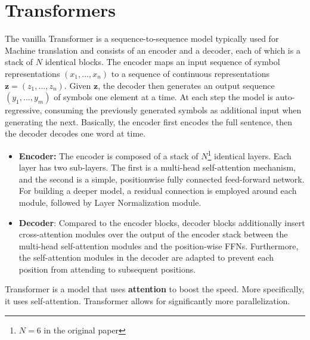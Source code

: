 \section{Transformers}
The vanilla Transformer is a sequence-to-sequence model typically used for Machine translation and consists of an encoder and a decoder, each of which is a stack of $N$ identical blocks. The encoder maps an input sequence of symbol representations $(x_1, ..., x_n)$ to a sequence of continuous representations $\textbf{z} = (z_1, ..., z_n)$. Given $\textbf{z}$, the decoder then generates an output sequence $(y_1, ..., y_m)$ of symbols one element at a time. At each step the model is auto-regressive, consuming the previously generated symbols as additional input when generating the next. Basically, the encoder first encodes the full sentence, then the decoder decodes one word at time.
\begin{itemize}
    \item \textbf{Encoder:} The encoder is composed of a stack of $N$\footnote{$N=6$ in the original paper} identical layers. Each layer has two sub-layers. The first is a multi-head self-attention mechanism, and the second is a simple, positionwise fully connected feed-forward network. For building a deeper model, a residual connection is employed around each module, followed by Layer Normalization module.

    \item \textbf{Decoder}: Compared to the encoder blocks, decoder blocks additionally insert cross-attention modules over the output of the encoder stack between the multi-head self-attention modules and the position-wise FFNs. Furthermore, the self-attention modules in the decoder are adapted to prevent each position from attending to subsequent positions.
\end{itemize}
Transformer is a model that uses \textbf{attention} to boost the speed. More specifically, it uses self-attention. Transformer allows for significantly more parallelization.
